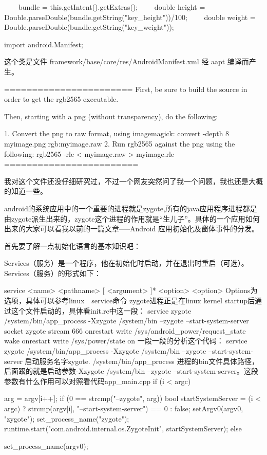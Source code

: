 \documentclass{book}
\begin{document}
\begin{CJK}{UTF8}{gbsn}
{　　bundle = this.getIntent().getExtras();
　　double height = Double.parseDouble(bundle.getString("key_height"))/100;
　　double weight = Double.parseDouble(bundle.getString("key_weight"));





import android.Manifest;

这个类是文件 framework/base/core/res/AndroidManifest.xml 经 aapt 编译而产生。

=======================
First, be sure to build the source in order to get the rgb2565
executable.

Then, starting with a png (without transparency), do the following:

1. Convert the png to raw format, using imagemagick:
   convert -depth 8 myimage.png rgb:myimage.raw
2. Run rgb2565 against the png using the following:
   rgb2565 -rle < myimage.raw > myimage.rle
   ========================


我对这个文件还没仔细研究过，不过一个网友突然问了我一个问题，我也还是大概的知道一些。

    android的系统应用中的一个重要的进程就是zygote,所有的java应用程序进程都是由zygote派生出来的，zygote这个进程的作用就是“生儿子”。具体的一个应用如何出来的大家可以看我以前的一篇文章-----Android 应用初始化及窗体事件的分发。

   首先要了解一点初始化语言的基本知识吧：

Services（服务）是一个程序，他在初始化时启动，并在退出时重启（可选）。Services（服务）的形式如下：

       service <name> <pathname> [ <argument> ]*
          <option>
          <option>
Options为选项，具体可以参考linux　service命令
zygote进程正是在linux kernel startup后通过这个文件启动的，具体看init.rc中这一段：
service zygote /system/bin/app_process -Xzygote /system/bin --zygote --start-system-server
    socket zygote stream 666
    onrestart write /sys/android_power/request_state wake
    onrestart write /sys/power/state on
一段一段的分析这个代码：
service zygote /system/bin/app_process -Xzygote /system/bin --zygote --start-system-server
启动服务名字zygote.   /system/bin/app_process 进程的bin文件具体路径，后面跟的就是启动参数-Xzygote /system/bin --zygote --start-system-server。这段参数有什么作用可以对照看代码app_main.cpp
if (i < argc) {
        arg = argv[i++];
        if (0 == strcmp("--zygote", arg)) {
            bool startSystemServer = (i < argc) ? 
                    strcmp(argv[i], "--start-system-server") == 0 : false;
            setArgv0(argv0, "zygote");
            set_process_name("zygote");
           runtime.start("com.android.internal.os.ZygoteInit",
                startSystemServer);
        } else {
            set_process_name(argv0);

}}}
\end{CJK}
\end{document}

